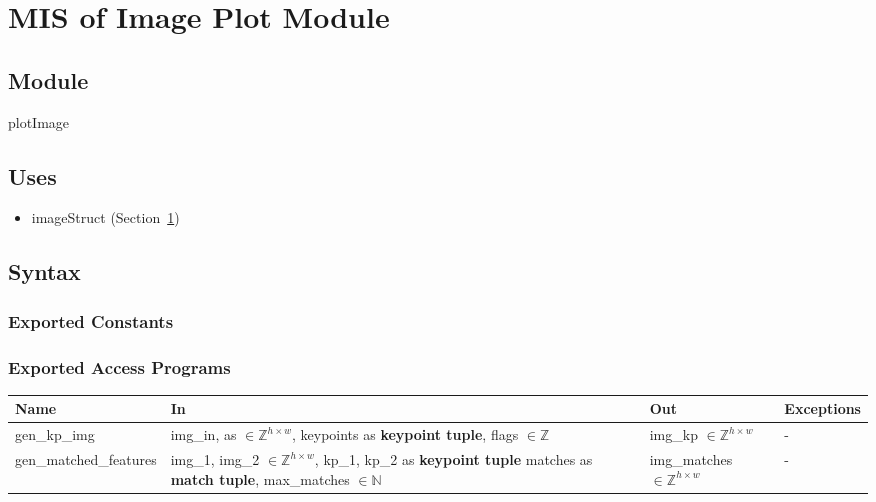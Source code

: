 \documentclass[12pt, titlepage]{article}
\begin{document}
\section{MIS of Image Plot Module} \label{mIP}
\subsection{Module}
plotImage

\subsection{Uses}
\begin{itemize}
  \item imageStruct (Section~\ref{mIP})
\end{itemize}

\subsection{Syntax}
\subsubsection{Exported Constants}

\subsubsection{Exported Access Programs}
\begin{center}
\begin{tabular}{p{4cm} p{5cm} p{4cm} p{2cm}}
\hline
\textbf{Name} & \textbf{In} & \textbf{Out} & \textbf{Exceptions} \\
\hline
gen\_kp\_img & img\_in, as $\in \mathbb{Z}^{h \times w}$, \newline
keypoints as \textbf{keypoint tuple}, \newline
flags $\in \mathbb{Z}$ & img\_kp $\in \mathbb{Z}^{h \times w}$ & - \\
\hline
gen\_matched\_features 
& img\_1, img\_2 $\in \mathbb{Z}^{h \times w}$, \newline
kp\_1, kp\_2 as \textbf{keypoint tuple} \newline
matches as \textbf{match tuple}, \newline 
max\_matches $\in \mathbb{N}$
& img\_matches $\in \mathbb{Z}^{h \times w}$ & - \\
\hline
\end{tabular}
\end{center}
\end{document}
